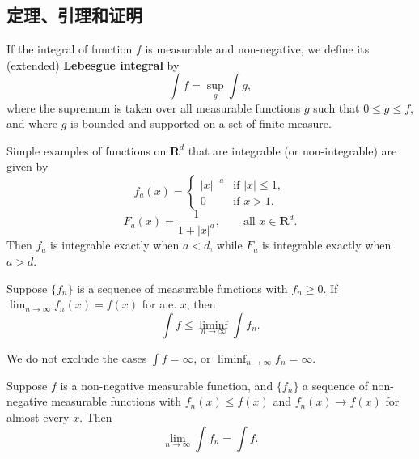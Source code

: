 \subsection{定理、引理和证明}

\begin{definition}
  If the integral of function $f$ is measurable and non-negative, we define
  its (extended) \textbf{Lebesgue integral} by
  \begin{equation}
  \int f = \sup_g \int g,
  \end{equation}
  where the supremum is taken over all measurable functions $g$ such that
  $0 \leq g \leq f$, and where $g$ is bounded and supported on a set of
  finite measure.
\end{definition}

\begin{example}
  Simple examples of functions on $\mathbf{R}^d$ that are integrable
  (or non-integrable) are given by
  \begin{equation}
  f_a(x) =
  \begin{cases}
  |x|^{-a} & \text{if } |x| \leq 1,\\
  0 & \text{if } x > 1.
  \end{cases}
  \end{equation}
  \begin{equation}
  F_a(x) = \frac{1}{1 + |x|^a}, \qquad \text{all } x \in \mathbf{R}^d.
  \end{equation}
  Then $f_a$ is integrable exactly when $a < d$, while $F_a$ is integrable
  exactly when $a > d$.
\end{example}

\begin{lemma}[Fatou]
  Suppose $\{f_n\}$ is a sequence of measurable functions with $f_n \geq 0$.
  If $\lim_{n \to \infty} f_n(x) = f(x)$ for a.e. $x$, then
  \begin{equation}
  \int f \leq \liminf_{n \to \infty} \int f_n.
  \end{equation}
\end{lemma}

\begin{remark}
  We do not exclude the cases $\int f = \infty$,
  or $\liminf_{n \to \infty} f_n = \infty$.
\end{remark}

\begin{corollary}
  Suppose $f$ is a non-negative measurable function, and $\{f_n\}$ a sequence
  of non-negative measurable functions with
  $f_n(x) \leq f(x)$ and $f_n(x) \to f(x)$ for almost every $x$. Then
  \begin{equation}
  \lim_{n \to \infty} \int f_n = \int f.
  \end{equation}
\end{corollary}

